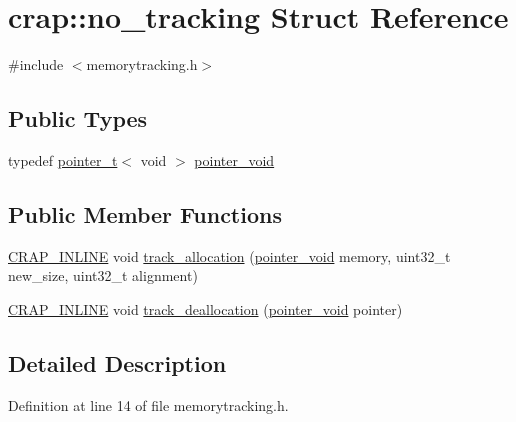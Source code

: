 \hypertarget{structcrap_1_1no__tracking}{\section{crap\+:\+:no\+\_\+tracking Struct Reference}
\label{structcrap_1_1no__tracking}
}


{\ttfamily \#include $<$memorytracking.\+h$>$}

\subsection*{Public Types}
\begin{DoxyCompactItemize}
\item 
typedef \hyperlink{structcrap_1_1pointer__t}{pointer\+\_\+t}$<$ void $>$ \hyperlink{structcrap_1_1no__tracking_af73abf0cb41ffe7aa60e37885885f328}{pointer\+\_\+void}
\end{DoxyCompactItemize}
\subsection*{Public Member Functions}
\begin{DoxyCompactItemize}
\item 
\hyperlink{config__x86_8h_a5a40526b8d842e7ff731509998bb0f1c}{C\+R\+A\+P\+\_\+\+I\+N\+L\+I\+N\+E} void \hyperlink{structcrap_1_1no__tracking_a76ca19312927808d11d005393104eb21}{track\+\_\+allocation} (\hyperlink{structcrap_1_1no__tracking_af73abf0cb41ffe7aa60e37885885f328}{pointer\+\_\+void} memory, uint32\+\_\+t new\+\_\+size, uint32\+\_\+t alignment)
\item 
\hyperlink{config__x86_8h_a5a40526b8d842e7ff731509998bb0f1c}{C\+R\+A\+P\+\_\+\+I\+N\+L\+I\+N\+E} void \hyperlink{structcrap_1_1no__tracking_ad4d2f6bab0cccaf679eae273f5f77530}{track\+\_\+deallocation} (\hyperlink{structcrap_1_1no__tracking_af73abf0cb41ffe7aa60e37885885f328}{pointer\+\_\+void} pointer)
\end{DoxyCompactItemize}


\subsection{Detailed Description}


Definition at line 14 of file memorytracking.\+h.



